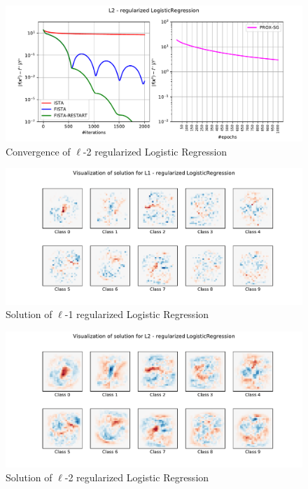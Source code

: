 \documentclass[12pt]{article}
\begin{document}
\begin{figure}
    \centering
    \includegraphics[width=17cm]{hw3/codes/exercise1/results/l2.pdf}
    \caption{Convergence of $\ell$-2 regularized Logistic Regression}
    \label{fig:l2-convergence}
\end{figure}

\begin{figure}
    \centering
    \includegraphics[width=17cm]{hw3/codes/exercise1/results/l1-numbers.pdf}
    \caption{Solution of $\ell$-1 regularized Logistic Regression}
    \label{fig:l1-solution}
\end{figure}

\begin{figure}
    \centering
    \includegraphics[width=17cm]{hw3/codes/exercise1/results/l2-numbers.pdf}
    \caption{Solution of $\ell$-2 regularized Logistic Regression}
    \label{fig:l2-solution}
\end{figure}
\end{document}

